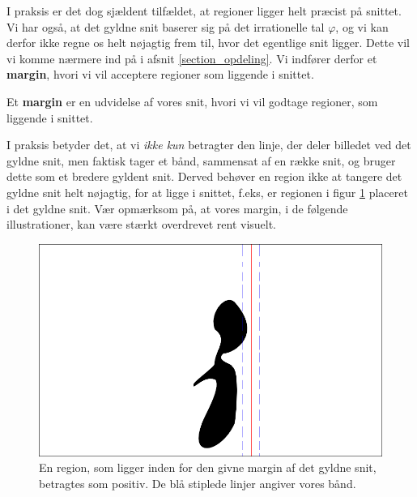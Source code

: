 {I praksis er det dog sjældent tilfældet, at regioner ligger helt præcist
på snittet.
Vi har også, at det gyldne snit baserer sig på det irrationelle tal
$\varphi$, og vi kan derfor ikke regne os helt nøjagtig frem til, hvor
det egentlige snit ligger. Dette vil vi komme nærmere ind på i afsnit
\ref{section_opdeling}. Vi indfører derfor et \textbf{margin}, hvori vi
vil acceptere regioner som liggende i snittet.
\begin{definition}
    Et \textbf{margin} er en udvidelse af vores snit, hvori vi vil
    godtage regioner, som liggende i snittet.
    \label{def_margin}
\end{definition}
I praksis betyder det, at vi \emph{ikke kun} betragter den linje, der
deler billedet ved det gyldne snit, men faktisk tager et bånd, sammensat
af en række snit, og bruger dette som et bredere gyldent snit.  Derved
behøver en region ikke at tangere det gyldne snit helt nøjagtig, for at
ligge i snittet, f.eks, er regionen i figur \ref{pos_naiv_margin_1}
placeret i det gyldne snit.  Vær opmærksom på, at vores margin, i de
følgende illustrationer, kan være stærkt overdrevet rent visuelt.
\begin{figure}[hb]
    \centering
    \includegraphics[scale=\imgscale,angle=0]{afsnit/vores_implementation/billeder/naiv_algoritme/naiv_positiv_blob_margin_1}
    \caption[Positiv region i margen]{En region, som ligger inden for
    den givne margin af det gyldne snit, betragtes som positiv. De blå
    stiplede linjer angiver vores bånd.}
    \label{pos_naiv_margin_1}
\end{figure}

}
